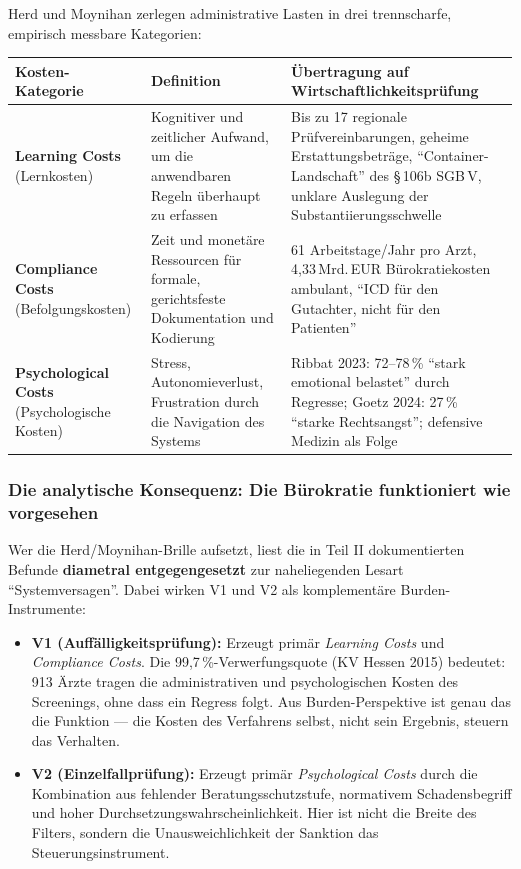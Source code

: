 \documentclass{umbruch-position}
\begin{document}
Herd und Moynihan zerlegen administrative Lasten in drei trennscharfe, empirisch messbare Kategorien:

{\small
\begin{tabularx}{\textwidth}{X X X}
\toprule
\textbf{Kosten-Kategorie} & \textbf{Definition} & \textbf{Übertragung auf Wirtschaftlichkeitsprüfung} \\
\midrule
\textbf{Learning Costs} (Lernkosten) & Kognitiver und zeitlicher Aufwand, um die anwendbaren Regeln überhaupt zu erfassen & Bis zu 17 regionale Prüfvereinbarungen, geheime Erstattungsbeträge, ``Container-Landschaft'' des \S\,106b SGB\,V, unklare Auslegung der Substantiierungsschwelle \\
\textbf{Compliance Costs} (Befolgungskosten) & Zeit und monetäre Ressourcen für formale, gerichtsfeste Dokumentation und Kodierung & 61 Arbeitstage/Jahr pro Arzt, 4,33\,Mrd.\,EUR Bürokratiekosten ambulant, ``ICD für den Gutachter, nicht für den Patienten'' \\
\textbf{Psychological Costs} (Psychologische Kosten) & Stress, Autonomieverlust, Frustration durch die Navigation des Systems & Ribbat 2023: 72--78\,\% ``stark emotional belastet'' durch Regresse; Goetz 2024: 27\,\% ``starke Rechtsangst''; defensive Medizin als Folge \\
\bottomrule
\end{tabularx}
}

\subsubsection{Die analytische Konsequenz: Die Bürokratie funktioniert wie vorgesehen}

Wer die Herd/Moynihan-Brille aufsetzt, liest die in Teil II dokumentierten Befunde \textbf{diametral entgegengesetzt} zur naheliegenden Lesart ``Systemversagen''. Dabei wirken V1 und V2 als komplementäre Burden-Instrumente:

\begin{itemize}[nosep]
  \item \textbf{V1 (Auffälligkeitsprüfung):} Erzeugt primär \textit{Learning Costs} und \textit{Compliance Costs}. Die 99,7\,\%-Verwerfungsquote (KV Hessen 2015) bedeutet: 913 Ärzte tragen die administrativen und psychologischen Kosten des Screenings, ohne dass ein Regress folgt. Aus Burden-Perspektive ist genau das die Funktion --- die Kosten des Verfahrens selbst, nicht sein Ergebnis, steuern das Verhalten.
  \item \textbf{V2 (Einzelfallprüfung):} Erzeugt primär \textit{Psychological Costs} durch die Kombination aus fehlender Beratungsschutzstufe, normativem Schadensbegriff und hoher Durchsetzungswahrscheinlichkeit. Hier ist nicht die Breite des Filters, sondern die Unausweichlichkeit der Sanktion das Steuerungsinstrument.
\end{itemize}
\end{document}
